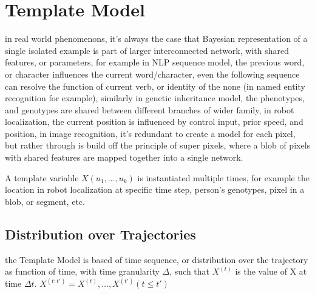 \documentclass[4apaper,12pt]{book}
\begin{document}
  \section{Template Model}
  \begin{description}
  \item in real world phenomenons, it's always the case that Bayesian representation of a single isolated example is part of larger interconnected network, with shared features, or parameters, for example in NLP sequence model, the previous word, or character influences the current word/character, even the following sequence can resolve the function of current verb, or identity of the none (in named entity recognition for example), similarly in genetic inheritance model, the phenotypes, and genotypes are shared between different branches of wider family, in robot localization, the current position is influenced by control input, prior speed, and position, in image recognition, it's redundant to create a model for each pixel, but rather through is build off the principle of super pixels, where a blob of pixels with shared features are mapped together into a single network.
  \item A template variable $X(u_1,\dots,u_k)$ is instantiated multiple times, for example the location in robot localization at specific time step, person's genotypes, pixel in a blob, or segment, etc.
    \subsection{Distribution over Trajectories}
    \begin{description}
    \item  the Template Model is based of time sequence, or distribution over the trajectory as function of time, with time granularity $\Delta$, such that $X^{(t)}$ is the value of X at time $\Delta{t}$. $X^{(t:t')} = { X^{(t)},\dots,X^{(t')}} (t \leq t')$
    \end{description}

\end{description}
\end{document}
